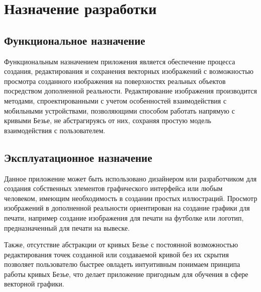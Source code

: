 \section{Назначение разработки}

\subsection{Функциональное назначение}

Функциональным назначением приложения является обеспечение процесса создания, редактирования и сохранения векторных изображений с возможностью просмотра созданного изображения на поверхностях реальных объектов посредством дополненной реальности. Редактирование изображения производится методами, спроектированными с учетом особенностей взаимодействия с мобильными устройствами, позволяющими способом работать напрямую с кривыми Безье, не абстрагируясь от них, сохраняя простую модель взаимодействия с пользователем.

\subsection{Эксплуатационное назначение}

Данное приложение может быть использовано дизайнером или разработчиком для создания собственных элементов графического интерфейса или любым человеком, имеющим необходимость в создании простых иллюстраций. Просмотр изображений в дополненной реальности ориентирован на создание графики для печати, например создание изображения для печати на футболке или логотип, предназначенный для печати на вывеске.

Также, отсутствие абстракции от кривых Безье с постоянной возможностью редактирования точек созданной или создаваемой кривой без их скрытия позволяет пользователю быстрее овладеть интуитивным понимаем принципа работы кривых Безье, что делает приложение пригодным для обучения в сфере векторной графики.